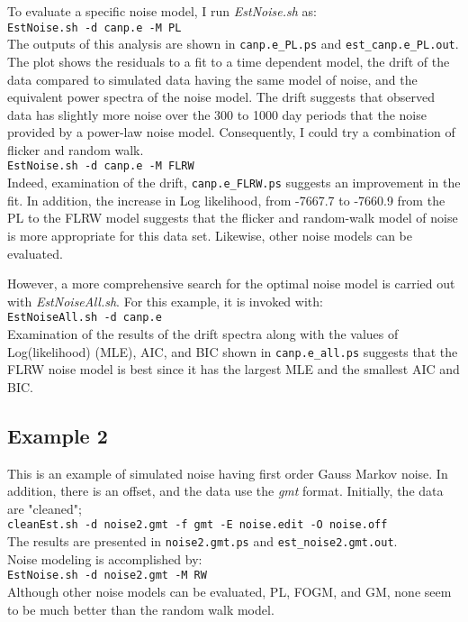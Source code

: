 \documentclass[12pt]{amsart}
\begin{document}
To evaluate a specific noise model, I run \textit{EstNoise.sh} as:
\\
\texttt{EstNoise.sh -d canp.e  -M PL}
\\
The outputs of this analysis are shown in  \texttt{canp.e\_PL.ps} and \texttt{est\_canp.e\_PL.out}.  The plot shows the
residuals to a fit to a time dependent model, the drift of the data compared to simulated data having the same
model of noise, and the equivalent power spectra of the noise model.  The drift suggests that observed data has slightly
more noise over the 300 to 1000 day periods that the noise provided by a power-law noise model.  Consequently, I could try a combination of flicker and random walk.
\\
\texttt{EstNoise.sh -d canp.e  -M FLRW}
\\
Indeed, examination of the drift, \texttt{canp.e\_FLRW.ps} suggests an improvement in the fit. In addition, the increase
in Log likelihood, from -7667.7 to -7660.9 from the PL to the FLRW model suggests that the flicker and random-walk 
model of noise is more appropriate for this data set.
Likewise, other noise models can be evaluated. 

However, a more comprehensive search for the optimal noise model is carried out with \textit{EstNoiseAll.sh}. For this example,
it is invoked with:
\\
\texttt{EstNoiseAll.sh -d canp.e }
\\
Examination of the results of the drift spectra along with the values of Log(likelihood) (MLE), AIC, and BIC shown in
\texttt{canp.e\_all.ps} suggests that the FLRW noise model is best since it has the largest MLE and the smallest AIC and BIC.

\subsection{Example 2}

This is an example of simulated noise having first order Gauss Markov noise. In addition, there is an offset, and the
data use the \textit{gmt} format.  Initially, the data are "cleaned";
\\
\texttt{cleanEst.sh -d noise2.gmt -f gmt -E noise.edit -O noise.off}
\\
The results are presented in \texttt{noise2.gmt.ps} and \texttt{est\_noise2.gmt.out}.
\\

Noise modeling is accomplished by:
\\
\texttt{EstNoise.sh  -d noise2.gmt  -M RW}
\\
Although other noise models can be evaluated, PL, FOGM, and GM, none seem to be much better than the random walk
model.
\end{document}
